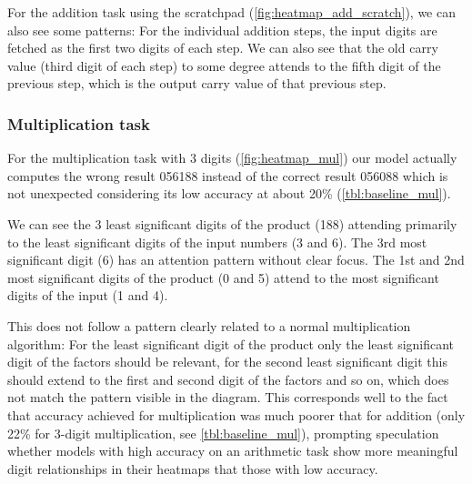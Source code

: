 For the addition task using the scratchpad (\cref{fig:heatmap_add_scratch}), we can also see some patterns: For the individual addition steps, the input digits are fetched as the first two digits of each step. We can also see that the old carry value (third digit of each step) to some degree attends to the fifth digit of the previous step, which is the output carry value of that previous step.








\FloatBarrier
\subsubsection{Multiplication task}


For the multiplication task with 3 digits (\cref{fig:heatmap_mul}) our model actually computes the wrong result 056188 instead of the correct result 056088 which is not unexpected considering its low accuracy at about 20\% (\cref{tbl:baseline_mul}).

We can see the 3 least significant digits of the product (188) attending primarily to the  least significant digits of the input numbers (3 and 6). The 3rd most significant digit (6) has an attention pattern without clear focus. The 1st and 2nd most significant digits of the product (0 and 5) attend to the most significant digits of the input (1 and 4).

This does not follow a pattern clearly related to a normal multiplication algorithm: For the least significant digit of the product only the least significant digit of the factors should be relevant, for the second least significant digit this should extend to the first and second digit of the factors and so on, which does not match the pattern visible in the diagram.
This corresponds well to the fact that accuracy achieved for multiplication was much poorer that for addition (only 22\% for 3-digit multiplication, see \cref{tbl:baseline_mul}), prompting speculation whether models with high accuracy on an arithmetic task show more meaningful digit relationships in their heatmaps that those with low accuracy.

